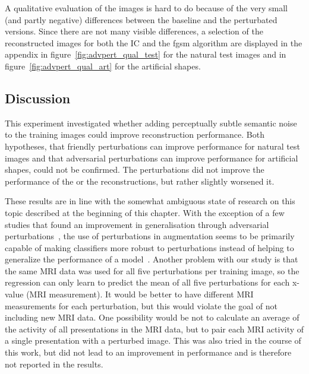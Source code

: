 A qualitative evaluation of the images is hard to do because of the very small (and partly negative) differences between the baseline and the perturbated versions. Since there are not many visible differences, a selection of the reconstructed images for both the IC and the fgsm algorithm are displayed in the appendix in figure~\ref{fig:advpert_qual_test} for the natural test images and in figure~\ref{fig:advpert_qual_art} for the artificial shapes.


\subsection{Discussion}
This experiment investigated whether adding perceptually subtle semantic noise to the training images could improve reconstruction performance. Both hypotheses, that friendly perturbations can improve performance for natural test images and that adversarial perturbations can improve performance for artificial shapes, could not be confirmed. The perturbations did not improve the performance of the  or the reconstructions, but rather slightly worsened it. 

These results are in line with the somewhat ambiguous state of research on this topic described at the beginning of this chapter. With the exception of a few studies that found an improvement in generalisation through adversarial perturbations~\cite{xieAdversarialExamplesImprove2020,yanEnhancingClassificationPerformance2023}, the use of perturbations in augmentation seems to be primarily capable of making classifiers more robust to perturbations instead of helping to generalize the performance of a model~\cite{goodfellowExplainingHarnessingAdversarial2014,madryDeepLearningModels2019}. Another problem with our study is that the same MRI data was used for all five perturbations per training image, so the regression can only learn to predict the mean of all five perturbations for each x-value (MRI measurement). It would be better to have different MRI measurements for each perturbation, but this would violate the goal of not including new MRI data. One possibility would be not to calculate an average of the activity of all presentations in the MRI data, but to pair each MRI activity of a single presentation with a perturbed image. This was also tried in the course of this work, but did not lead to an improvement in performance and is therefore not reported in the results. 

